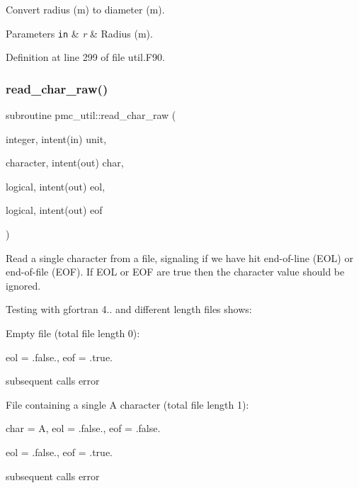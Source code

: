 Convert radius (m) to diameter (m). 


\begin{DoxyParams}[1]{Parameters}
\mbox{\tt in}  & {\em r} & Radius (m). \\
\hline
\end{DoxyParams}


Definition at line 299 of file util.\+F90.

\mbox{\label{namespacepmc__util_ad88e1503acea1e8e33d13275f37b9755}} 
\subsubsection{\texorpdfstring{read\+\_\+char\+\_\+raw()}{read\_char\_raw()}}
{\footnotesize\ttfamily subroutine pmc\+\_\+util\+::read\+\_\+char\+\_\+raw (\begin{DoxyParamCaption}\item[{integer, intent(in)}]{unit,  }\item[{character, intent(out)}]{char,  }\item[{logical, intent(out)}]{eol,  }\item[{logical, intent(out)}]{eof }\end{DoxyParamCaption})}



Read a single character from a file, signaling if we have hit end-\/of-\/line (E\+OL) or end-\/of-\/file (E\+OF). If E\+OL or E\+OF are true then the character value should be ignored. 

Testing with gfortran 4.. and different length files shows\+:

Empty file (total file length 0)\+:
\begin{DoxyItemize}
\item eol = .false., eof = .true.
\item subsequent calls error
\end{DoxyItemize}

File containing a single \textquotesingle{}A\textquotesingle{} character (total file length 1)\+:
\begin{DoxyItemize}
\item char = \textquotesingle{}A\textquotesingle{}, eol = .false., eof = .false.
\item eol = .false., eof = .true.
\item subsequent calls error
\end{DoxyItemize}

